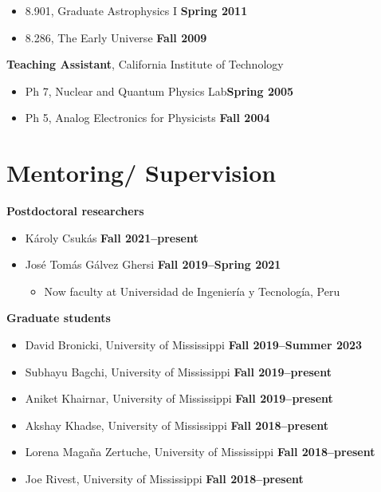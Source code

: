 \documentclass[margin,line]{res}
\begin{document}
\begin{resume}
\begin{itemize}
    \item[ ] 8.901, Graduate Astrophysics I \hfill {\bf Spring 2011}
    \item[ ] 8.286, The Early Universe \hfill {\bf Fall 2009}
  \end{itemize}
  {\bf Teaching Assistant}, California Institute of Technology
  \vspace*{.05in}
  \begin{itemize}
    \item[ ] Ph 7, Nuclear and Quantum Physics Lab\hfill {\bf Spring 2005}
    \item[ ] Ph 5, Analog Electronics for Physicists \hfill {\bf Fall 2004}
  \end{itemize}

  \section{\sc Mentoring/
    Supervision}
   {\bf Postdoctoral researchers}
  \begin{itemize}
    \item[] Károly Csukás
      \hfill {\bf Fall 2021--present}
    \item[] José Tomás Gálvez Ghersi
      \hfill {\bf Fall 2019--Spring 2021}
      \begin{itemize}
        \vspace{-.05in}
        \item[] Now faculty at Universidad de Ingeniería y Tecnología, Peru
          \vspace{-.05in}
      \end{itemize}
  \end{itemize}
  {\bf Graduate students}
  \begin{itemize}
    \item[] David Bronicki, University of Mississippi
      \hfill {\bf Fall 2019--Summer 2023}
    \item[] Subhayu Bagchi, University of Mississippi
      \hfill {\bf Fall 2019--present}
    \item[] Aniket Khairnar, University of Mississippi
      \hfill {\bf Fall 2019--present}
    \item[] Akshay Khadse, University of Mississippi
      \hfill {\bf Fall 2018--present}
    \item[] Lorena Magaña Zertuche, University of Mississippi
      \hfill {\bf Fall 2018--present}
    \item[] Joe Rivest, University of Mississippi
      \hfill {\bf Fall 2018--present}

\end{itemize}
\end{resume}
\end{document}
